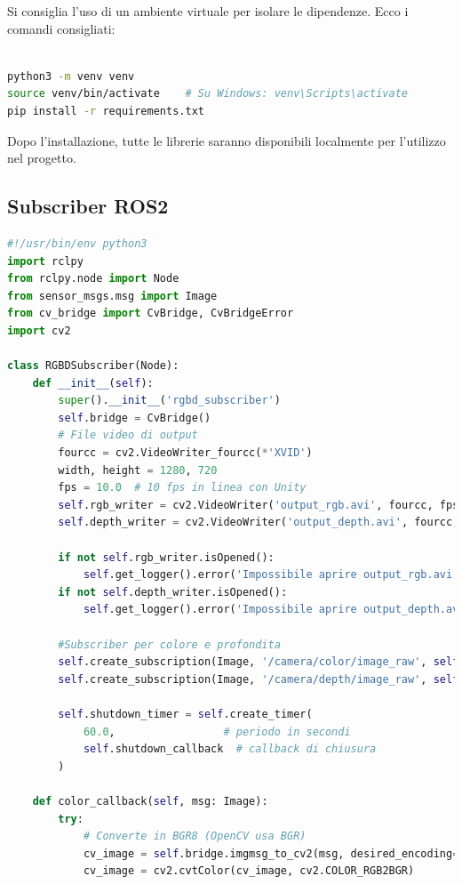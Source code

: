 \documentclass[11pt]{report}
\begin{document}
Si consiglia l'uso di un ambiente virtuale per isolare le dipendenze. Ecco i comandi consigliati:

\begin{lstlisting}[language=bash]

python3 -m venv venv
source venv/bin/activate    # Su Windows: venv\Scripts\activate
pip install -r requirements.txt
\end{lstlisting}


\noindent Dopo l’installazione, tutte le librerie saranno disponibili localmente per l’utilizzo nel progetto.




\subsection{Subscriber ROS2}
\begin{lstlisting}[language=Python, caption=Subscriber RGB-D ROS2 con salvataggio video, label=lst:rgbd_subscriber]
#!/usr/bin/env python3
import rclpy
from rclpy.node import Node
from sensor_msgs.msg import Image
from cv_bridge import CvBridge, CvBridgeError
import cv2

class RGBDSubscriber(Node):
    def __init__(self):
        super().__init__('rgbd_subscriber')
        self.bridge = CvBridge()
        # File video di output
        fourcc = cv2.VideoWriter_fourcc(*'XVID')
        width, height = 1280, 720
        fps = 10.0  # 10 fps in linea con Unity
        self.rgb_writer = cv2.VideoWriter('output_rgb.avi', fourcc, fps, (width, height))
        self.depth_writer = cv2.VideoWriter('output_depth.avi', fourcc, fps, (width, height), isColor=False)

        if not self.rgb_writer.isOpened():
            self.get_logger().error('Impossibile aprire output_rgb.avi') 
        if not self.depth_writer.isOpened():
            self.get_logger().error('Impossibile aprire output_depth.avi') 

        #Subscriber per colore e profondita
        self.create_subscription(Image, '/camera/color/image_raw', self.color_callback, 10)
        self.create_subscription(Image, '/camera/depth/image_raw', self.depth_callback, 10)

        self.shutdown_timer = self.create_timer(
            60.0,                 # periodo in secondi
            self.shutdown_callback  # callback di chiusura
        )

    def color_callback(self, msg: Image):
        try:
            # Converte in BGR8 (OpenCV usa BGR)
            cv_image = self.bridge.imgmsg_to_cv2(msg, desired_encoding='rgb8')
            cv_image = cv2.cvtColor(cv_image, cv2.COLOR_RGB2BGR)


\end{lstlisting}
\end{document}
